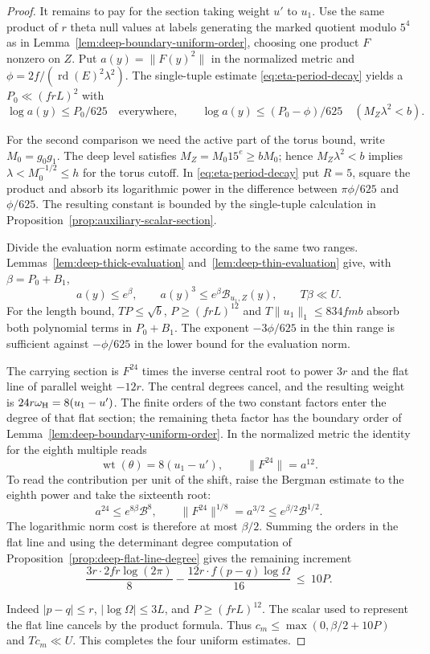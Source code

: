 \begin{proof}
It remains to pay for the section taking weight \(u'\) to \(u_1\). Use the same product of \(r\) theta null values at labels generating the marked quotient modulo \(5^4\) as in Lemma~\ref{lem:deep-boundary-uniform-order}, choosing one product \(F\) nonzero on \(Z\). Put \(a(y)=\|F(y)^2\|\) in the normalized metric and \(\phi=2f/(\operatorname{rd}(E)^2\lambda^2)\).
The single-tuple estimate \eqref{eq:eta-period-decay} yields a \(P_0\ll(frL)^2\) with
\[
 \log a(y)\le P_0/625\quad\text{everywhere},\qquad
 \log a(y)\le (P_0-\phi)/625\quad(M_Z\lambda^2<b).
\]

For the second comparison we need the active part of the torus bound, write \(M_0=g_0g_1\). The deep level satisfies \(M_Z=M_0 15^e\ge bM_0\); hence \(M_Z\lambda^2<b\) implies \(\lambda<M_0^{-1/2}\le h\) for the torus cutoff. In \eqref{eq:eta-period-decay} put \(R=5\), square the product and absorb its logarithmic power in the difference between \(\pi\phi/625\) and \(\phi/625\). The resulting constant is bounded by the single-tuple calculation in Proposition~\ref{prop:auxiliary-scalar-section}.

Divide the evaluation norm estimate according to the same two ranges. Lemmas~\ref{lem:deep-thick-evaluation} and~\ref{lem:deep-thin-evaluation} give, with \(\beta=P_0+B_1\),
\[
        a(y)\le e^\beta,\qquad
        a(y)^3\le e^\beta\mathcal B_{u_1,Z}(y),
        \qquad T\beta\ll U .
\]
For the length bound, \(TP\le\sqrt b\), \(P\ge(frL)^{12}\) and \(T\|u_1\|_1\le834fmb\) absorb both polynomial terms in \(P_0+B_1\). The exponent \(-3\phi/625\) in the thin range is sufficient against \(-\phi/625\) in the lower bound for the evaluation norm.

The carrying section is \(F^{24}\) times the inverse central root to power \(3r\) and the flat line of parallel weight \(-12r\). The central degrees cancel, and the resulting weight is \(24r\omega_{\rm H}=8(u_1-u')\). The finite orders of the two constant factors enter the degree of that flat section; the remaining theta factor has the boundary order of Lemma~\ref{lem:deep-boundary-uniform-order}. In the normalized metric the identity for the eighth multiple reads
\[
      \operatorname{wt}(\theta)=8(u_1-u'),\qquad \|F^{24}\|=a^{12}.
\]
 To read the contribution per unit of the shift, raise the Bergman estimate to the eighth power and take the sixteenth root:
\[
      a^{24}\le e^{8\beta}\mathcal B^8,\qquad
      \|F^{24}\|^{1/8}=a^{3/2}\le e^{\beta/2}\mathcal B^{1/2}.
\]
The logarithmic norm cost is therefore at most \(\beta/2\). Summing the orders in the flat line and using the determinant degree computation of Proposition~\ref{prop:deep-flat-line-degree} gives the remaining increment
\[
 \frac{3r\cdot2fr\log(2\pi)}{8}
       -\frac{12r\cdot f(p-q)\log\Omega}{16}
       \ \le\ 10P .
\]

Indeed \(|p-q|\le r\), \(|\log\Omega|\le3L\), and \(P\ge(frL)^{12}\). The scalar used to represent the flat line cancels by the product formula. Thus \(c_m\le \max(0,\beta/2+10P)\) and \(Tc_m\ll U\). This completes the four uniform estimates.
\end{proof}
